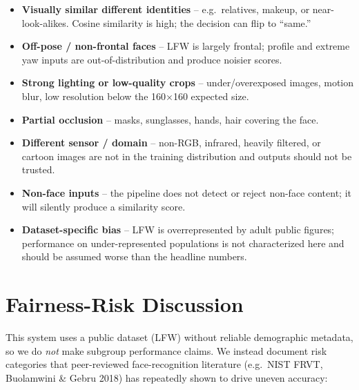 \documentclass[11pt]{article}
\begin{document}
\begin{itemize}[noitemsep, leftmargin=*]
    \item \textbf{Visually similar different identities} -- e.g.\ relatives, makeup, or
    near-look-alikes. Cosine similarity is high; the decision can flip to ``same.''
    \item \textbf{Off-pose / non-frontal faces} -- LFW is largely frontal; profile and
    extreme yaw inputs are out-of-distribution and produce noisier scores.
    \item \textbf{Strong lighting or low-quality crops} -- under/overexposed images,
    motion blur, low resolution below the 160$\times$160 expected size.
    \item \textbf{Partial occlusion} -- masks, sunglasses, hands, hair covering the face.
    \item \textbf{Different sensor / domain} -- non-RGB, infrared, heavily filtered, or
    cartoon images are not in the training distribution and outputs should not be trusted.
    \item \textbf{Non-face inputs} -- the pipeline does not detect or reject
    non-face content; it will silently produce a similarity score.
    \item \textbf{Dataset-specific bias} -- LFW is overrepresented by adult public
    figures; performance on under-represented populations is not characterized here
    and should be assumed worse than the headline numbers.
\end{itemize}

\section{Fairness-Risk Discussion}
This system uses a public dataset (LFW) without reliable demographic metadata, so we do
\emph{not} make subgroup performance claims. We instead document risk categories that
peer-reviewed face-recognition literature (e.g.\ NIST FRVT, Buolamwini \& Gebru 2018) has
repeatedly shown to drive uneven accuracy:
\end{document}
